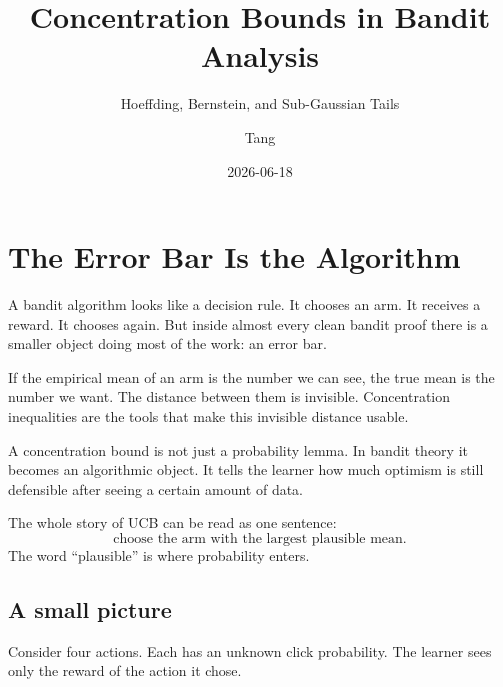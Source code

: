 \documentclass[en,nofont,11pt]{elegantbook}
\title{Concentration Bounds in Bandit Analysis}
\subtitle{Hoeffding, Bernstein, and Sub-Gaussian Tails}
\author{Tang}
\institute{Tang's Machine Learning Blog}
\date{2026-06-18}
\begin{document}
\maketitle
\frontmatter
\tableofcontents
\mainmatter

\chapter{The Error Bar Is the Algorithm}

A bandit algorithm looks like a decision rule. It chooses an arm. It receives a reward. It chooses again. But inside almost every clean bandit proof there is a smaller object doing most of the work: an error bar.

If the empirical mean of an arm is the number we can see, the true mean is the number we want. The distance between them is invisible. Concentration inequalities are the tools that make this invisible distance usable.

\begin{keyidea}
A concentration bound is not just a probability lemma. In bandit theory it becomes an algorithmic object. It tells the learner how much optimism is still defensible after seeing a certain amount of data.
\end{keyidea}

The whole story of UCB can be read as one sentence:
\[
\text{choose the arm with the largest plausible mean.}
\]
The word ``plausible'' is where probability enters.

\section{A small picture}

Consider four actions. Each has an unknown click probability. The learner sees only the reward of the action it chose.

\begin{center}
\end{center}
\end{document}
